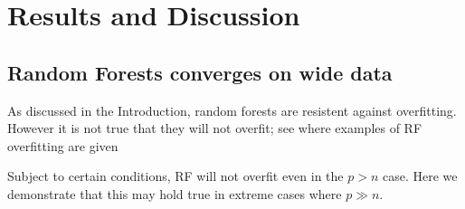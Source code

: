 \documentclass[10pt,letterpaper]{article}
\begin{document}

\section*{Results and Discussion}




\subsection*{Random Forests converges on wide data}

As discussed in the Introduction,
random forests are resistent against overfitting.
However it is not true that they will not overfit; see \cite{Segal.2004} where examples of RF overfitting are given 

Subject to certain conditions, RF will not overfit even in the  $p > n$ case. 
Here we demonstrate that this may hold true in extreme cases where $p \gg n$.
\end{document}
